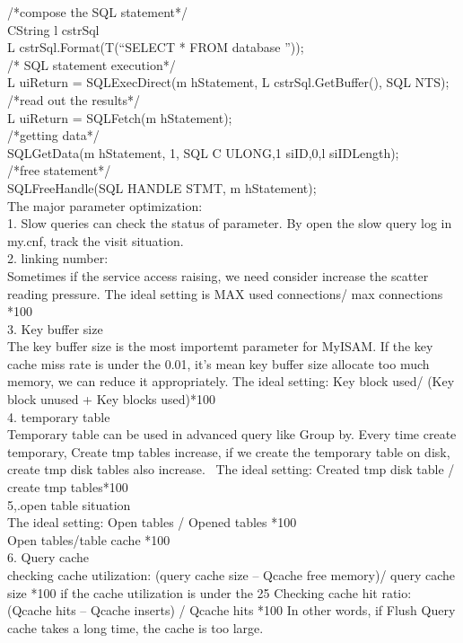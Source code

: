 \documentclass[onecolumn, draftclsnofoot,10pt, compsoc]{IEEEtran}
\begin{document}
/*compose the SQL statement*/\\ 
CString l cstrSql\\
L cstrSql.Format(T(“SELECT * FROM database ”));\\

/* SQL statement execution*/\\
L uiReturn = SQLExecDirect(m hStatement, L cstrSql.GetBuffer(), SQL NTS);\\ 

/*read out the results*/\\
L uiReturn = SQLFetch(m hStatement); \\
/*getting data*/\\
SQLGetData(m hStatement, 1, SQL C ULONG,1 siID,0,l siIDLength); \\

/*free statement*/\\
SQLFreeHandle(SQL HANDLE STMT, m hStatement);\\ 


The major parameter optimization:\\
1. Slow queries can check the status of parameter. By open the slow query log in my.cnf, track the visit situation.\\ 

2. linking number:\\
Sometimes if the service access raising, we need consider increase the scatter reading pressure. The ideal setting is MAX used connections/ max connections *100\\

3. Key buffer size \\
The key buffer size is the most importemt parameter for MyISAM. If the key cache miss rate is under the 0.01, it's mean key buffer size allocate too much memory, we can reduce it appropriately. 
The ideal setting: Key block used/ (Key block unused + Key blocks used)*100\\%
4. temporary table\\
Temporary table can be used in advanced query like Group by. Every time create temporary, Create tmp tables increase, if we create the temporary table on disk, create tmp disk tables also increase. \
The ideal setting: Created tmp disk table / create tmp tables*100\\%

5,.open table situation\\
The ideal setting: Open tables / Opened tables *100\\%
               Open tables/table cache *100\\%
6. Query cache\\
checking cache utilization: (query cache size – Qcache free memory)/ query cache size *100%
if the cache utilization is under the 25%
Checking cache hit ratio: (Qcache hits – Qcache inserts) / Qcache hits *100%
In other words, if Flush Query cache takes a long time, the cache is too large. 
\end{document}
